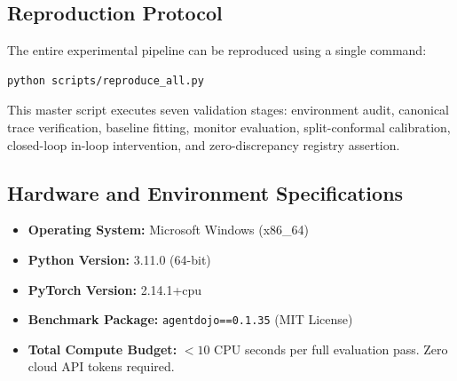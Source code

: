 \documentclass[11pt,a4paper]{article}
\begin{document}
\subsection{Reproduction Protocol}
The entire experimental pipeline can be reproduced using a single command:
\begin{verbatim}
python scripts/reproduce_all.py
\end{verbatim}
This master script executes seven validation stages: environment audit, canonical trace verification, baseline fitting, monitor evaluation, split-conformal calibration, closed-loop in-loop intervention, and zero-discrepancy registry assertion.

\subsection{Hardware and Environment Specifications}
\begin{itemize}
    \item \textbf{Operating System:} Microsoft Windows (x86\_64)
    \item \textbf{Python Version:} 3.11.0 (64-bit)
    \item \textbf{PyTorch Version:} 2.14.1+cpu
    \item \textbf{Benchmark Package:} \texttt{agentdojo==0.1.35} (MIT License)
    \item \textbf{Total Compute Budget:} $< 10$ CPU seconds per full evaluation pass. Zero cloud API tokens required.
\end{itemize}
\end{document}

